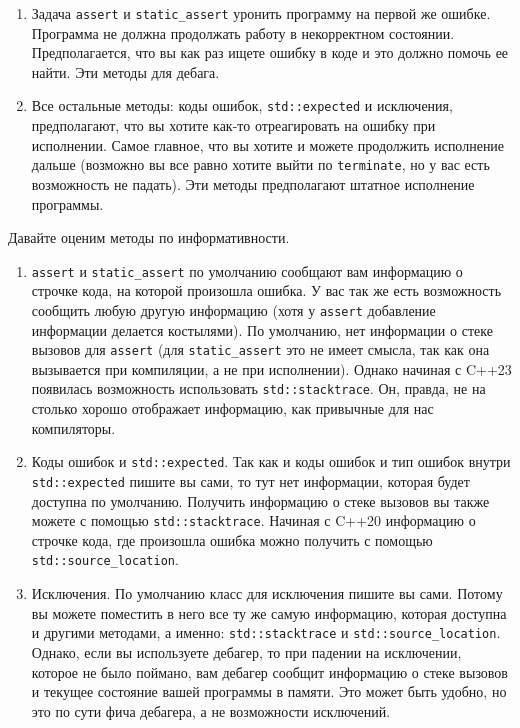 \begin{enumerate}
\item Задача \verb"assert" и \verb"static_assert" уронить программу на первой же ошибке.
Программа не должна продолжать работу в некорректном состоянии.
Предполагается, что вы как раз ищете ошибку в коде и это должно помочь ее найти.
Эти методы для дебага.

\item Все остальные методы: коды ошибок, \verb"std::expected" и исключения, предполагают, что вы хотите как-то отреагировать на ошибку при исполнении.
Самое главное, что вы хотите и можете продолжить исполнение дальше (возможно вы все равно хотите выйти по \verb"terminate", но у вас есть возможность не падать).
Эти методы предполагают штатное исполнение программы.
\end{enumerate}

Давайте оценим методы по информативности.
\begin{enumerate}
\item \verb"assert" и \verb"static_assert" по умолчанию сообщают вам информацию о строчке кода, на которой произошла ошибка.
У вас так же есть возможность сообщить любую другую информацию (хотя у \verb"assert" добавление информации делается костылями).
По умолчанию, нет информации о стеке вызовов для \verb"assert" (для \verb"static_assert" это не имеет смысла, так как она вызывается при компиляции, а не при исполнении).
Однако начиная с C++23 появилась возможность использовать \verb"std::stacktrace".
Он, правда, не на столько хорошо отображает информацию, как привычные для нас компиляторы.

\item Коды ошибок и \verb"std::expected".
Так как и коды ошибок и тип ошибок внутри \verb"std::expected" пишите вы сами, то тут нет информации, которая будет доступна по умолчанию.
Получить информацию о стеке вызовов вы также можете с помощью \verb"std::stacktrace".
Начиная с C++20 информацию о строчке кода, где произошла ошибка можно получить с помощью \verb"std::source_location".

\item Исключения.
По умолчанию класс для исключения пишите вы сами.
Потому вы можете поместить в него все ту же самую информацию, которая доступна и другими методами, а именно: \verb"std::stacktrace" и \verb"std::source_location".
Однако, если вы используете дебагер, то при падении на исключении, которое не было поймано, вам дебагер сообщит информацию о стеке вызовов и текущее состояние вашей программы в памяти.
Это может быть удобно, но это по сути фича дебагера, а не возможности исключений.
\end{enumerate}

